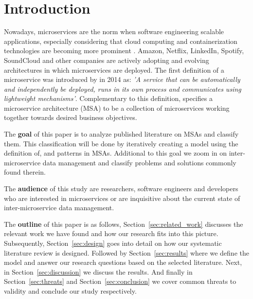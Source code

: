 \section{Introduction}

Nowadays, microservices are the norm when software engineering scalable applications, especially considering that cloud computing and containerization technologies are becoming more prominent \cite{Jaramillo2016,Liu2020629,Akbulut201919}. Amazon, Netflix, LinkedIn, Spotify, SoundCloud and other companies \cite{7333476,Yahia20163, DiFrancesco201977} are actively adopting and evolving architectures in which microservices are deployed. The first definition of a microservice was introduced by \cite{martinfowler2014microservices} in 2014 as: \textit{'A service that can be automatically and independently be deployed, runs in its own process and communicates using lightweight mechanisms'}. Complementary to this definition, \cite{martinfowler2014microservices} specifies a microservice architecture (MSA) to be a collection of microservices working together towards desired business objectives.

The \textbf{goal} of this paper is to analyze published literature on MSAs and classify them. This classification will be done by iteratively creating a model using the definition of, and patterns in MSAs. Additional to this goal we zoom in on inter-microservice data management and classify problems and solutions commonly found therein.

The \textbf{audience} of this study are researchers, software engineers and developers who are interested in microservices or are inquisitive about the current state of inter-microservice data management.

The \textbf{outline} of this paper is as follows, Section~\ref{sec:related_work} discusses the relevant work we have found and how our research fits into this picture. Subsequently, Section~\ref{sec:design} goes into detail on how our systematic literature review is designed. Followed by Section~\ref{sec:results} where we define the model and answer our research questions based on the selected literature. Next, in Section~\ref{sec:discussion} we discuss the results. And finally in Section~\ref{sec:threats} and Section~\ref{sec:conclusion} we cover common threats to validity and conclude our study respectively.

